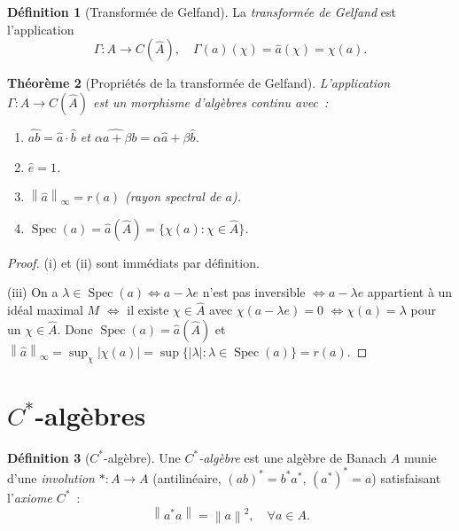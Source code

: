 \documentclass[a4paper,12pt]{book}
\DeclareMathOperator{\Spec}{Spec}
\newcommand{\norm}[1]{\left\| #1 \right\|}
\newcommand{\abs}[1]{\left| #1 \right|}
\theoremstyle{definition}
\newtheorem{definition}{Définition}[chapter]
\theoremstyle{plain}
\newtheorem{theoreme}[definition]{Théorème}
\theoremstyle{remark}
\begin{document}
\begin{definition}[Transformée de Gelfand]
\label{def:transformee-gelfand}
La \emph{transformée de Gelfand} est l'application
\[
  \Gamma : A \to C(\hat A), \quad \Gamma(a)(\chi) = \hat a(\chi) = \chi(a).
\]
\end{definition}

\begin{theoreme}[Propriétés de la transformée de Gelfand]
\label{thm:gelfand-morphisme}
L'application $\Gamma : A \to C(\hat A)$ est un morphisme d'algèbres continu avec~:
\begin{enumerate}[label=(\roman*)]
  \item $\widehat{ab} = \hat a \cdot \hat b$ et $\widehat{\alpha a + \beta b} = \alpha\hat a + \beta \hat b$.
  \item $\hat e = 1$.
  \item $\norm{\hat a}_\infty = r(a)$ (rayon spectral de $a$).
  \item $\Spec(a) = \hat a(\hat A) = \{\chi(a) : \chi \in \hat A\}$.
\end{enumerate}
\end{theoreme}

\begin{proof}
(i) et (ii) sont immédiats par définition.

(iii) On a $\lambda \in \Spec(a) \iff a - \lambda e$ n'est pas inversible
$\iff a - \lambda e$ appartient à un idéal maximal $M$
$\iff$ il existe $\chi \in \hat A$ avec $\chi(a - \lambda e) = 0$
$\iff \chi(a) = \lambda$ pour un $\chi \in \hat A$.
Donc $\Spec(a) = \hat a(\hat A)$ et
$\norm{\hat a}_\infty = \sup_\chi \abs{\chi(a)} = \sup\{\abs{\lambda} : \lambda \in \Spec(a)\} = r(a)$.
\end{proof}

\section{$C^*$-algèbres}

\begin{definition}[$C^*$-algèbre]
\label{def:cstar}
Une \emph{$C^*$-algèbre} est une algèbre de Banach $A$ munie d'une
\emph{involution} $* : A \to A$ (antilinéaire, $(ab)^* = b^*a^*$,
$(a^*)^* = a$) satisfaisant l'\emph{axiome $C^*$}~:
\[
  \norm{a^*a} = \norm{a}^2, \quad \forall a \in A.
\]
\end{definition}
\end{document}
